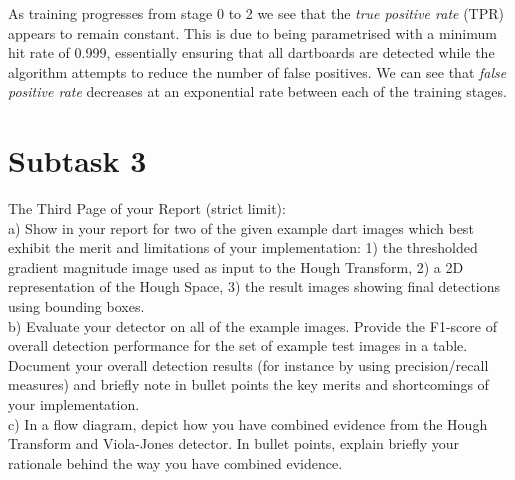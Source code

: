 \documentclass[conference]{IEEEtran}
\begin{document}

As training progresses from stage 0 to 2 we see that the \textit{true positive rate} (TPR) appears to remain constant. This is due to being parametrised with a minimum hit rate of 0.999, essentially ensuring that all dartboards are detected while the algorithm attempts to reduce the number of false positives. We can see that \textit{false positive rate} decreases at an exponential rate between each of the training stages.

\section{Subtask 3}

The Third Page of your Report (strict limit):\\
a) Show in your report for two of the given example dart
images which best exhibit the merit and limitations of your
implementation: 1) the thresholded gradient magnitude
image used as input to the Hough Transform, 2) a 2D
representation of the Hough Space, 3) the result images
showing final detections using bounding boxes.\\
b) Evaluate your detector on all of the example images.
Provide the F1-score of overall detection performance for
the set of example test images in a table. Document your
overall detection results (for instance by using
precision/recall measures) and briefly note in bullet points
the key merits and shortcomings of your implementation.\\
c) In a flow diagram, depict how you have combined
evidence from the Hough Transform and Viola-Jones
detector. In bullet points, explain briefly your rationale
behind the way you have combined evidence.
\end{document}
